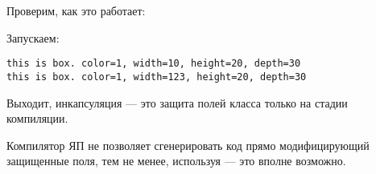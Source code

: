 

Проверим, как это работает:



Запускаем:

\begin{lstlisting}
this is box. color=1, width=10, height=20, depth=30
this is box. color=1, width=123, height=20, depth=30
\end{lstlisting}

Выходит, инкапсуляция --- это защита полей класса только на стадии компиляции.

Компилятор ЯП \Cpp не позволяет сгенерировать код прямо
модифицирующий защищенные поля, тем не менее, используя  --- это вполне возможно.


